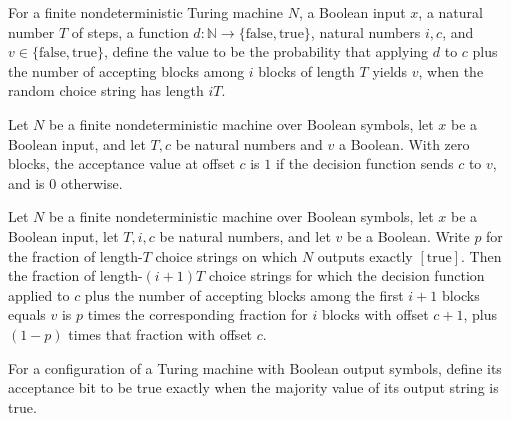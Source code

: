 \begin{definition}
\label{Randomized.Amplify.val}
\leanok
{}
For a finite nondeterministic Turing machine $N$, a Boolean input $x$, a natural number
$T$ of steps, a function $d:\mathbb{N}\to\{\mathrm{false},\mathrm{true}\}$, natural
numbers $i,c$, and $v\in\{\mathrm{false},\mathrm{true}\}$, define the value to be the
probability that applying $d$ to $c$ plus the number of accepting blocks among $i$
blocks of length $T$ yields $v$, when the random choice string has length $iT$.
\end{definition}

\begin{theorem}
\label{Randomized.Amplify.val_zero}
\leanok
{}
Let $N$ be a finite nondeterministic machine over Boolean symbols, let $x$ be a Boolean
input, and let $T,c$ be natural numbers and $v$ a Boolean. With zero blocks, the
acceptance value at offset $c$ is $1$ if the decision function sends $c$ to $v$, and is
$0$ otherwise.
\end{theorem}

\begin{theorem}
\label{Randomized.Amplify.val_succ}
\leanok
{}
Let $N$ be a finite nondeterministic machine over Boolean symbols, let $x$ be a Boolean
input, let $T,i,c$ be natural numbers, and let $v$ be a Boolean. Write $p$ for the
fraction of length-$T$ choice strings on which $N$ outputs exactly $[\mathrm{true}]$.
Then the fraction of length-$(i+1)T$ choice strings for which the decision function
applied to $c$ plus the number of accepting blocks among the first $i+1$ blocks equals
$v$ is $p$ times the corresponding fraction for $i$ blocks with offset $c+1$, plus
$(1-p)$ times that fraction with offset $c$.
\end{theorem}

\begin{definition}
\label{Randomized.Amplify.accBit}
\leanok
{}
For a configuration of a Turing machine with Boolean output symbols, define its
acceptance bit to be true exactly when the majority value of its output string is true.
\end{definition}

